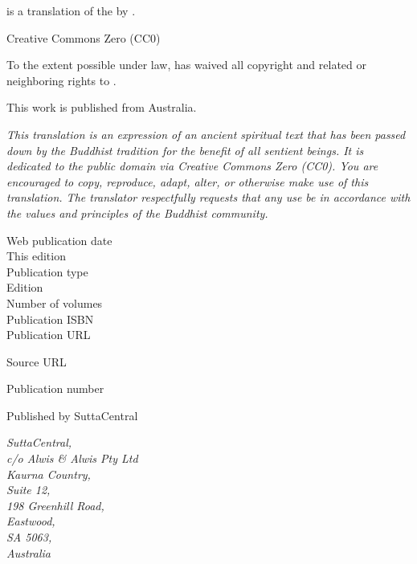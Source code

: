 
\begin{footnotesize}

\textit{} is a translation of the  by .

\medskip

Creative Commons Zero (CC0)

To the extent possible under law,  has waived all copyright and related or neighboring rights to \textit{}.

\medskip

This work is published from Australia.

\begin{center}
\textit{This translation is an expression of an ancient spiritual text that has been passed down by the Buddhist tradition for the benefit of all sentient beings. It is dedicated to the public domain via Creative Commons Zero (CC0). You are encouraged to copy, reproduce, adapt, alter, or otherwise make use of this translation. The translator respectfully requests that any use be in accordance with the values and principles of the Buddhist community.}
\end{center}

\medskip

\begin{description}
    \item[Web publication date] 
    \item[This edition] 
    \item[Publication type] 
    \item[Edition] 
    \item[Number of volumes] 
    \item[Publication ISBN] 
    \item[Publication URL] \href{\VAR{publication_url | safe}}{}
    \item[Source URL] \href{\VAR{source_url | safe}}{}
    \item[Publication number] 
\end{description}

\medskip

Published by SuttaCentral

\medskip

\textit{SuttaCentral,\\
c/o Alwis \& Alwis Pty Ltd\\
Kaurna Country,\\
Suite 12,\\
198 Greenhill Road,\\
Eastwood,\\
SA 5063,\\
Australia}

\end{footnotesize}

\newpage

\setlength{\parindent}{1.5em}%
